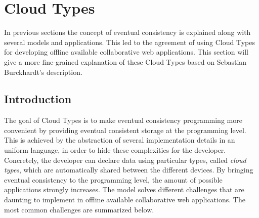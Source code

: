 \documentclass[a4paper,12pt]{report}
\begin{document}
\begin{comment}
In order to take account of these requirements, Cloud Types seems to best solution to implement offline available collaborative web applications. Cloud types focuses on most of the above criteria. Although, it has some shortcomings for easily implementing the desired applications. The Cloud Types model will be discussed in detail in the following section.

\end{comment}


\chapter{Cloud Types}\label{cha:CloudTypes} %

In previous sections the concept of eventual consistency is explained along with several models and applications. This led to the agreement of using Cloud Types for developing offline available collaborative web applications. This section will give a more fine-grained explanation of these Cloud Types based on Sebastian Burckhardt's description.

\section{Introduction}\label{sec:Introduction}

The goal of Cloud Types is to make eventual consistency programming more convenient by providing eventual consistent storage at the programming level. This is achieved by the abstraction of several implementation details in an uniform language, in order to hide these complexities for the developer. Concretely, the developer can declare data using particular types, called \textit{cloud types}, which are automatically shared between the different devices. By bringing eventual consistency to the programming level, the amount of possible applications strongly increases. The model solves different challenges that are daunting to implement in offline available collaborative web applications. The most common challenges are summarized below.
\end{document}
